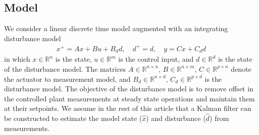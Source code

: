 \documentclass[preprint,5p, twocolumn, authoryear]{elsarticle}
\newcommand{\bbR}{\mathbb{R}}
\begin{document}
\subsection{Model}
We consider a linear discrete time model augmented with an 
integrating disturbance model \citep{pannocchia:rawlings:2003}
\begin{align}\label{eq:ltimodel}
    x^+ = Ax + Bu + B_dd, \quad d^+ = d, \quad y = Cx + C_dd
\end{align}
in which $x \in \bbR^n$ is the state, 
$u \in \bbR^m$ is the control input, and
$d \in \bbR^d$ is the state of the disturbance
model. The matrices $A \in \bbR^{n \times n}$, 
$B \in \bbR^{n \times m}$,  
$C \in \bbR^{p \times n}$ denote the actuator to measurement 
model, and $B_d \in \bbR^{n \times d}$, $C_d \in \bbR^{p \times d}$
is the disturbance model.
The objective of the disturbance model
is to remove offset in the controlled 
plant measurements at steady
state operations and maintain
them at their setpoints.
We assume in the rest of this 
article that a Kalman filter can be constructed to 
estimate the model state ($\hat{x}$) and disturbance ($\hat{d}$) 
from measurements. 
\end{document}
